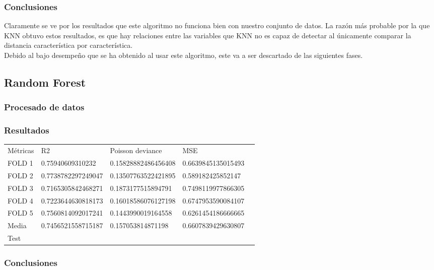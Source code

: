 \subsubsection{Conclusiones}
Claramente se ve por los resultados que este algoritmo no funciona bien con nuestro conjunto de datos. La razón más probable por la que KNN obtuvo estos resultados, es que hay relaciones entre las variables que KNN no es capaz de detectar al únicamente comparar la distancia característica por característica. \\
Debido al bajo desempeño que se ha obtenido al usar este algoritmo, este va a ser descartado de las siguientes fases.
\pagebreak
\subsection{Random Forest}
\subsubsection{Procesado de datos}
\subsubsection{Resultados}
\begin{table}[htbp]
    \begin{tabular}{|l|l|l|l|l}
    \cline{1-4}
    Métricas & R2                 & Poisson deviance    & MSE                \\ \cline{1-4}
    FOLD 1   & 0.75940609310232   & 0.15828882486456408 & 0.6639845135015493 \\ \cline{1-4}
    FOLD 2   & 0.7738782297249047 & 0.13507763522421895 & 0.589182425852147  \\ \cline{1-4}
    FOLD 3   & 0.7165305842468271 & 0.1873177515894791  & 0.7498119977866305 \\ \cline{1-4}
    FOLD 4   & 0.7223644630818173 & 0.16018586076127198 & 0.6747953590084107 \\ \cline{1-4}
    FOLD 5   & 0.7560814092017241 & 0.1443990019164558  & 0.6261454186666665 \\ \cline{1-4}
    Media    & 0.7456521558715187 & 0.157053814871198   & 0.6607839429630807 \\ \cline{1-4}
    Test & & & \\ \cline{1-4}
    \end{tabular}
\end{table}
\subsubsection{Conclusiones}
\pagebreak

